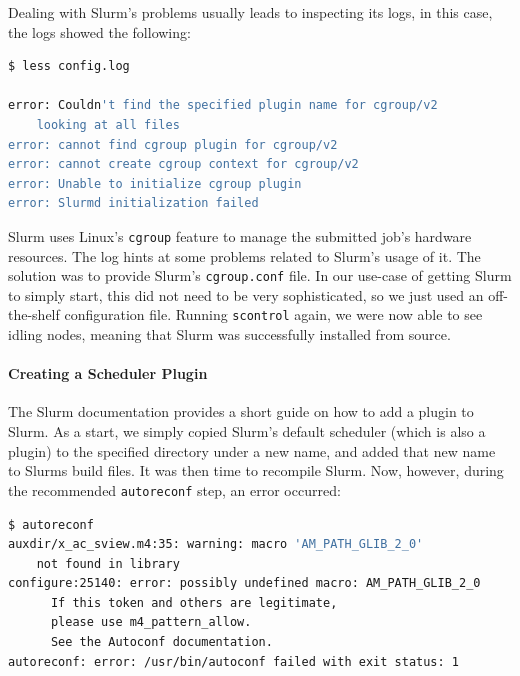 Dealing with Slurm's problems usually leads to inspecting its logs, in this case, the logs showed the following:

\begin{minipage}{\linewidth}
\begin{lstlisting}[language=bash, frame=single, numbers=none, caption={Slurm's cgroup configuration is missing according to the logs}, basicstyle=\ttfamily]
$ less config.log

error: Couldn't find the specified plugin name for cgroup/v2
    looking at all files
error: cannot find cgroup plugin for cgroup/v2
error: cannot create cgroup context for cgroup/v2
error: Unable to initialize cgroup plugin
error: Slurmd initialization failed
\end{lstlisting}
\end{minipage}

Slurm uses Linux's \verb|cgroup| feature to manage the submitted job's hardware resources. The log hints at some problems related to Slurm's usage of it.
The solution was to provide Slurm's \verb|cgroup.conf| file. In our use-case of getting Slurm to simply start, this did not need to be very sophisticated, so we just used an off-the-shelf configuration file.
Running \verb|scontrol| again, we were now able to see idling nodes, meaning that Slurm was successfully installed from source.

\paragraph{Creating a Scheduler Plugin}

The Slurm documentation provides a short guide on how to add a plugin to Slurm.
As a start, we simply copied Slurm's default scheduler (which is also a plugin) to the specified directory under a new name, and added that new name to Slurms build files. 
It was then time to recompile Slurm. 
Now, however, during the recommended \verb|autoreconf| step, an error occurred:

\begin{minipage}{\linewidth}
\begin{lstlisting}[language=bash, frame=single, numbers=none, caption={Plugin recompilation errors}, basicstyle=\ttfamily]
$ autoreconf
auxdir/x_ac_sview.m4:35: warning: macro 'AM_PATH_GLIB_2_0' 
    not found in library
configure:25140: error: possibly undefined macro: AM_PATH_GLIB_2_0
      If this token and others are legitimate, 
      please use m4_pattern_allow.
      See the Autoconf documentation.
autoreconf: error: /usr/bin/autoconf failed with exit status: 1
\end{lstlisting}
\end{minipage}

